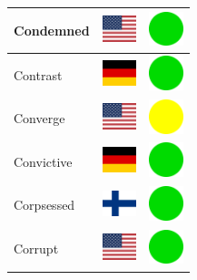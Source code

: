\documentclass[12pt, a4paper, twoside]{report}
\begin{document}
\begin{center}
\begin{longtable}{|p{5cm}|p{2cm}|p{2cm}|}
 Condemned                                                  & \includegraphics[width=1cm]{../4x3/us} &   \includegraphics[width=1cm]{../likes/y} \\ \hline
 Contrast                                                   & \includegraphics[width=1cm]{../4x3/de} &   \includegraphics[width=1cm]{../likes/y} \\ \hline
 Converge                                                   & \includegraphics[width=1cm]{../4x3/us} &   \includegraphics[width=1cm]{../likes/m} \\ \hline
 Convictive                                                 & \includegraphics[width=1cm]{../4x3/de} &   \includegraphics[width=1cm]{../likes/y} \\ \hline
 Corpsessed                                                 & \includegraphics[width=1cm]{../4x3/fi} &   \includegraphics[width=1cm]{../likes/y} \\ \hline
 Corrupt                                                    & \includegraphics[width=1cm]{../4x3/us} &   \includegraphics[width=1cm]{../likes/y} \\ \hline

\end{longtable}
\end{center}
\end{document}
